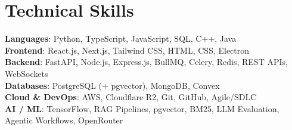 \documentclass[a4paper,11pt]{article}
\begin{document}
\section{\textbf{Technical Skills}}
 \begin{itemize}[leftmargin=0.05in, label={}]
    \small{\item{
     \textbf{Languages}{: Python, TypeScript, JavaScript, SQL, C++, Java} \\
     \textbf{Frontend}{: React.js, Next.js, Tailwind CSS, HTML, CSS, Electron} \\
     \textbf{Backend}{: FastAPI, Node.js, Express.js, BullMQ, Celery, Redis, REST APIs, WebSockets} \\
     \textbf{Databases}{: PostgreSQL (+ pgvector), MongoDB, Convex} \\
     \textbf{Cloud \& DevOps}{: AWS, Cloudflare R2, Git, GitHub, Agile/SDLC} \\
     \textbf{AI / ML}{: TensorFlow, RAG Pipelines, pgvector, BM25, LLM Evaluation, Agentic Workflows, OpenRouter}
    }}
 \end{itemize}
\vspace{-8pt}
\end{document}
